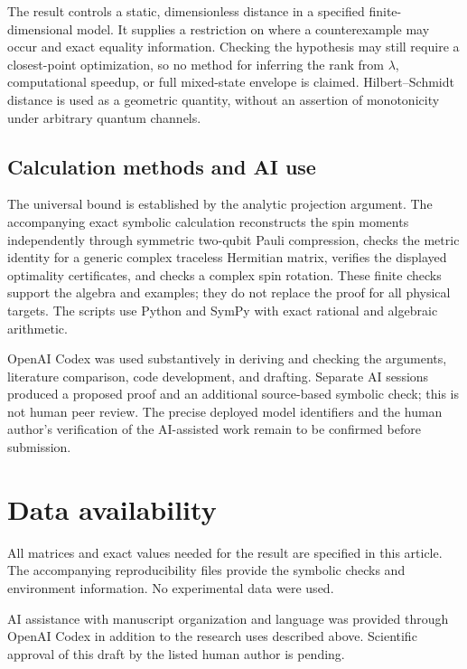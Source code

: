 \documentclass[aps,pra,reprint,amsmath,amssymb,superscriptaddress,longbibliography]{revtex4-2}
\begin{document}
The result controls a static, dimensionless distance in a specified finite-dimensional model. It supplies a restriction on where a counterexample may occur and exact equality information. Checking the hypothesis may still require a closest-point optimization, so no method for inferring the rank from \(\lambda\), computational speedup, or full mixed-state envelope is claimed. Hilbert--Schmidt distance is used as a geometric quantity, without an assertion of monotonicity under arbitrary quantum channels.

\subsection*{Calculation methods and AI use}

The universal bound is established by the analytic projection argument. The accompanying exact symbolic calculation reconstructs the spin moments independently through symmetric two-qubit Pauli compression, checks the metric identity for a generic complex traceless Hermitian matrix, verifies the displayed optimality certificates, and checks a complex spin rotation. These finite checks support the algebra and examples; they do not replace the proof for all physical targets. The scripts use Python and SymPy with exact rational and algebraic arithmetic.

OpenAI Codex was used substantively in deriving and checking the arguments, literature comparison, code development, and drafting. Separate AI sessions produced a proposed proof and an additional source-based symbolic check; this is not human peer review. The precise deployed model identifiers and the human author's verification of the AI-assisted work remain to be confirmed before submission.

\section*{Data availability}

All matrices and exact values needed for the result are specified in this article. The accompanying reproducibility files provide the symbolic checks and environment information. No experimental data were used.

\begin{acknowledgments}
AI assistance with manuscript organization and language was provided through OpenAI Codex in addition to the research uses described above. Scientific approval of this draft by the listed human author is pending.
\end{acknowledgments}
\end{document}
